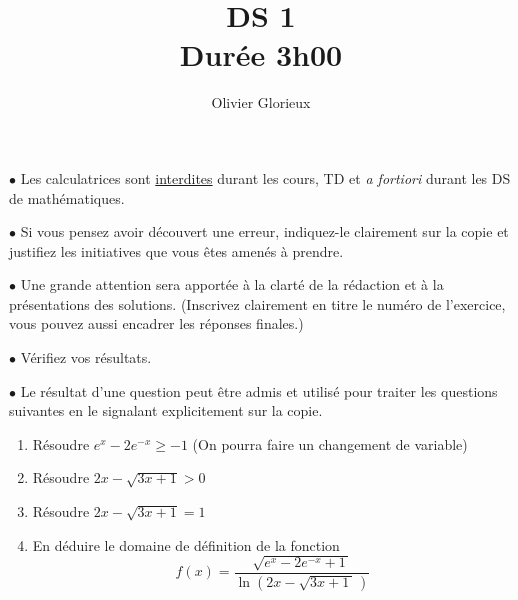 \documentclass[a4paper, 11pt,reqno]{article}
\author{Olivier Glorieux}
\begin{document}
\title{DS 1\\
\Large{Durée 3h00}
}

\vspace{1cm}
\begin{center}

\begin{description}
\item$\bullet$ Les calculatrices sont \underline{interdites} durant les cours, TD et \emph{a fortiori} durant les DS de mathématiques. \\

\item $\bullet $ Si vous pensez avoir découvert une erreur, indiquez-le clairement sur la copie et justifiez les initiatives que vous êtes amenés à prendre. \\

\item $\bullet$ Une grande attention sera apportée à la clarté de la rédaction et à la présentations des solutions. (Inscrivez clairement en titre le numéro de l'exercice, vous pouvez aussi encadrer les réponses finales.)  \\

\item $\bullet$ Vérifiez vos résultats. \\

\item $\bullet$ Le résultat d'une question peut être admis et utilisé pour traiter les questions suivantes en le signalant explicitement sur la copie. 
\end{description}

\end{center} 

\newpage

\begin{exercice}
\begin{enumerate}
\item Résoudre $e^{x}-2e^{-x}\geq -1$ (On pourra faire un changement de variable)
\item Résoudre $2x-\sqrt{3x+1} >0$
\item Résoudre $2x-\sqrt{3x+1} =1$
\item En déduire le domaine de définition de la fonction 
$$f(x) =\frac{\sqrt{e^x-2e^{-x}+1\,}}{\ln\left(2x-\sqrt{3x+1\,} \,\right)}$$
\end{enumerate}
\end{exercice}
\end{document}
